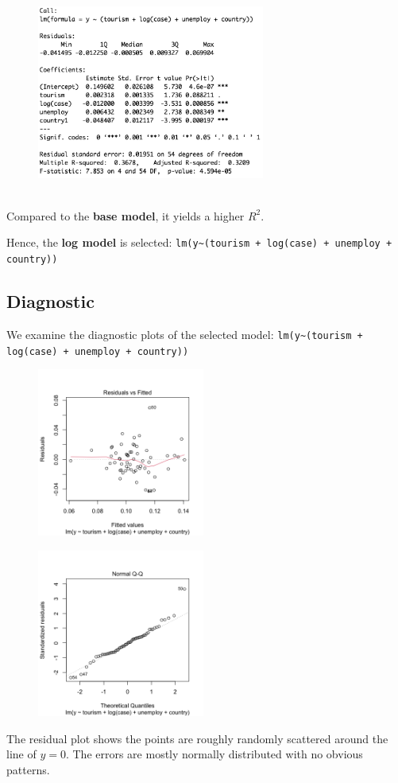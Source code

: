 \documentclass{article}
\begin{document}
\begin{figure}[H]
\centering
  \includegraphics[width= 7.5cm]{summary-log.png}
  \label{fig:QQ}
\end{figure}\\

Compared to the \textbf{base model}, it yields a higher $R^2$.

Hence, the \textbf{log model} is selected:  \verb|lm(y~(tourism + log(case) + unemploy + country))|



\subsection{Diagnostic}
We examine the diagnostic plots of the selected model: \verb|lm(y~(tourism + log(case) + unemploy + country))|
\begin{figure}[H]
\centering
\begin{minipage}{.5\textwidth}
  \centering
  \includegraphics[width= 5.5cm]{residual.png}
  \label{fig:resid}
\end{minipage}%
\begin{minipage}{.5\textwidth}
  \centering
  \includegraphics[width= 5.5cm]{qqplot.png}
  \label{fig:QQ}
\end{minipage}
\end{figure}
The residual plot shows the points are roughly randomly scattered around the line of $y = 0$. The errors are mostly normally distributed with no obvious patterns.
\end{document}
